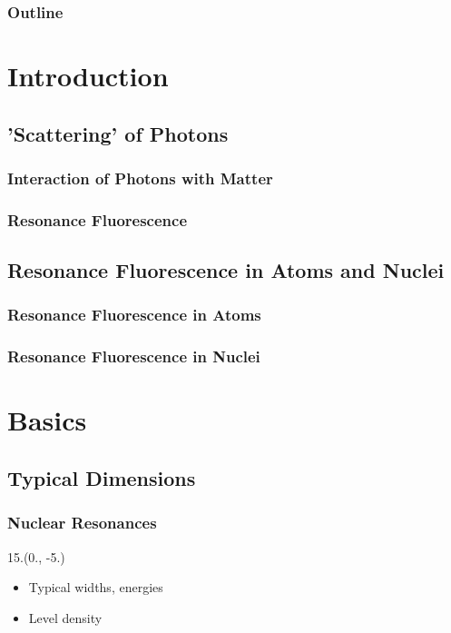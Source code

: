 \documentclass{beamer}
\begin{document}
\begin{frame}
    \titlepage
\end{frame}

\begin{frame}
    \frametitle{Outline}
    \tableofcontents
\end{frame}

\section{Introduction}

\subsection{'Scattering' of Photons}

\begin{frame}
    \frametitle{Interaction of Photons with Matter}
\end{frame}

\begin{frame}
    \frametitle{Resonance Fluorescence}
\end{frame}

\subsection{Resonance Fluorescence in Atoms and Nuclei}

\begin{frame}
    \frametitle{Resonance Fluorescence in Atoms}
\end{frame}

\begin{frame}
    \frametitle{Resonance Fluorescence in Nuclei}
\end{frame}

\section{Basics}

\subsection{Typical Dimensions}

\begin{frame}
    \frametitle{Nuclear Resonances}
    \begin{textblock}{15.}(0., -5.)
        \begin{itemize}
            \item Typical widths, energies
            \item Level density
        \end{itemize}
    \end{textblock}
\end{frame}
\end{document}
